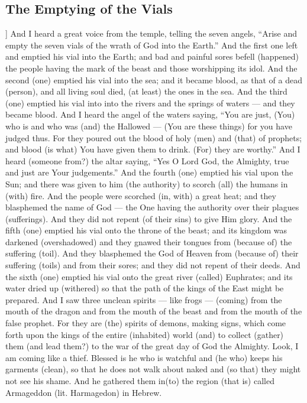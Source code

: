 \begin{pages}
\begin{Leftside}
        			\chapter{The Emptying of the Vials}
				]		
		And I heard a great voice from the temple, telling the seven angels, “Arise and empty the seven vials of the wrath of God into the Earth.” And the first one left and emptied his vial into the Earth; and bad and painful sores befell (happened) the people having the mark of the beast and those worshipping its idol. 
		\pend
		\pstart
		And the second (one) emptied his vial into the sea; and it became blood, as that of a dead (person), and all living soul died, (at least) the ones in the sea. And the third (one) emptied his vial into into the rivers and the springs of waters — and they became blood. And I heard the angel of the waters saying, “You are just, (You) who is and who was (and) the Hallowed — (You are these things) for you have judged thus. For they poured out the blood of holy (men) and (that) of prophets; and blood (is what) You have given them to drink. (For) they are worthy.”
		\pend
		\pstart
		And I heard (someone from?) the altar saying, “Yes O Lord God, the Almighty, true and just are Your judgements.” And the fourth (one) emptied his vial upon the Sun; and there was given to him (the authority) to scorch (all) the humans in (with) fire. And the people were scorched (in, with) a great heat; and they blasphemed the name of God — the One having the authority over their plagues (sufferings). And they did not repent (of their sins) to give Him glory. 
		\pend
		\pstart
		And the fifth (one) emptied his vial onto the throne of the beast; and its kingdom was darkened (overshadowed) and they gnawed their tongues from (because of) the suffering (toil). And they blasphemed the God of Heaven from (because of) their suffering (toils) and from their sores; and they did not repent of their deeds. 
		\pend
		\pstart
		And the sixth (one) emptied his vial onto the great river (called) Euphrates; and its water dried up (withered) so that the path of the kings of the East might be prepared. And I saw three unclean spirits — like frogs — (coming) from the mouth of the dragon and from the mouth of the beast and from the mouth of the false prophet. For they are (the) spirits of demons, making signs, which come forth upon the kings of the entire (inhabited) world (and) to collect (gather) them (and lead them?) to the war of the great day of God the Almighty. 
		\pend
		\pstart
		Look, I am coming like a thief. Blessed is he who is watchful and (he who) keeps his garments (clean), so that he does not walk about naked and (so that) they might not see his shame. And he gathered them in(to) the region (that is) called Armageddon (lit. Harmagedon) in Hebrew. 

\end{Leftside}
\end{pages}
